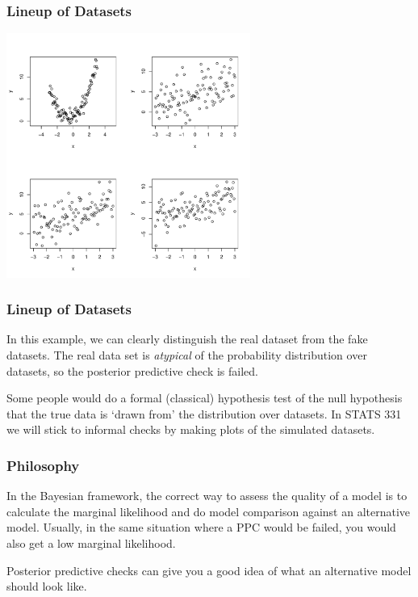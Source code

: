 \documentclass{beamer}
\begin{document}
\begin{frame}[fragile]
\frametitle{Lineup of Datasets}

\begin{center}
\includegraphics[width=0.6\textwidth]{images/quadratic_lineup.pdf}
\end{center}


\end{frame}


\begin{frame}[fragile]
\frametitle{Lineup of Datasets}
In this example, we can clearly distinguish the real dataset from the
fake datasets. The real data set is {\em atypical} of the probability
distribution over datasets, so the posterior predictive check is failed.\\[0.5em]\pause

Some people would do a formal (classical) hypothesis test of the null hypothesis
that the true data is `drawn from' the distribution over datasets. In STATS 331
we will stick to informal checks by making plots of the simulated datasets.

\end{frame}


\begin{frame}[fragile]
\frametitle{Philosophy}
In the Bayesian framework, the correct way to assess the quality of a model
is to calculate the marginal likelihood and do model comparison against an
alternative model. Usually, in the same situation where a PPC would be failed,
you would also get a low marginal likelihood.\\[0.5em]\pause

Posterior predictive checks can give you a good idea of what an alternative
model should look like.

\end{frame}
\end{document}
